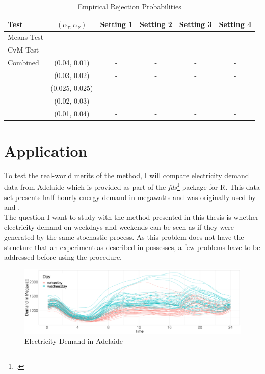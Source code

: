 \documentclass[12pt, a4paper]{article}
\theoremstyle{MAstyle} \newtheorem{assumption}{Assumption}[section]
\theoremstyle{MAstyle} \newtheorem{definition}{Definition}[section]
\begin{document}
		\begin{table}[h!]
			\centering
			\begin{tabular}{lccccc}\toprule
				\textbf{Test}	&$\left(\alpha_{\tau}, \alpha_{\nu}\right) $ &\textbf{Setting 1} &\textbf{Setting 2}	&\textbf{Setting 3} &\textbf{Setting 4}\\
				\midrule
				Means-Test		& -	& -	& -  & - & - \\
				CvM-Test 		& -	& -	& -  & - & - \\
				\midrule
				Combined		& (0.04, 0.01)		& -	& -  & - & - \\
								& (0.03, 0.02)	& -	& -  & - & - \\
								& (0.025, 0.025)		& -	& -  & - & - \\
								& (0.02, 0.03)	& -	& -  & - & - \\
								& (0.01, 0.04)	& -	& -  & - & - \\
				\bottomrule
			\end{tabular}
			\caption{Empirical Rejection Probabilities}
		\end{table}
		
	\section{Application}\label{Application}
		To test the real-world merits of the method, I will compare electricity demand data from Adelaide which is provided as part of the \textit{fds}\footcite{fds} package for R. This data set presents half-hourly energy demand in megawatts and was originally used by \cite{magnano_generation_2007} and \cite{magnano_generation_2008}.\\
		The question I want to study with the method presented in this thesis is whether electricity demand on weekdays and weekends can be seen as if they were generated by the same stochastic process. As this problem does not have the structure that an experiment as described in \cite{bugni_permutation_2021} possesses, a few problems have to be addressed before using the procedure.
	
		\begin{figure}[H]
			\includegraphics[width=\textwidth]{../Graphics/electricity_demand_curves.PDF}
			\caption{Electricity Demand in Adelaide}
			\label{electricity_demand}
		\end{figure}
		
\end{document}
